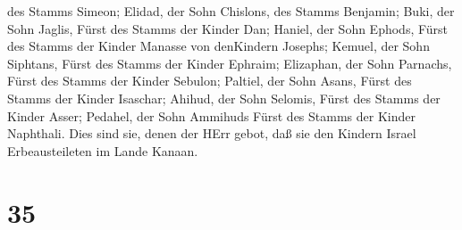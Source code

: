 des Stamms Simeon;  Elidad, der Sohn Chislons, des Stamms
Benjamin;  Buki, der Sohn Jaglis, Fürst des Stamms der
Kinder Dan;  Haniel, der Sohn Ephods, Fürst des Stamms der
Kinder Manasse von denKindern Josephs;  Kemuel, der Sohn
Siphtans, Fürst des Stamms der Kinder Ephraim;  Elizaphan,
der Sohn Parnachs, Fürst des Stamms der Kinder Sebulon; 
Paltiel, der Sohn Asans, Fürst des Stamms der Kinder Isaschar;
 Ahihud, der Sohn Selomis, Fürst des Stamms der Kinder
Asser;  Pedahel, der Sohn Ammihuds Fürst des Stamms der
Kinder Naphthali.  Dies sind sie, denen der HErr gebot, daß
sie den Kindern Israel Erbeausteileten im Lande Kanaan.

\hypertarget{section-34}{%
\section{35}\label{section-34}}

